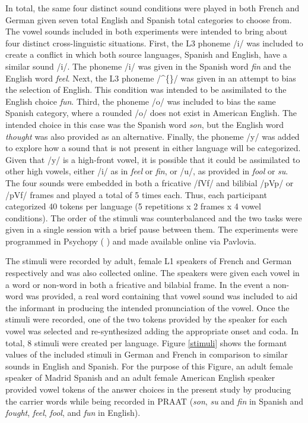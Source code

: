\documentclass[preprints]{Definitions/mdpi}
\begin{document}
In total, the same four distinct sound conditions were played in both French and German given seven total English and Spanish total categories to choose from.
The vowel sounds included in both experiments were intended to bring about four distinct cross-linguistic situations.
First, the L3 phoneme /i/ was included to create a conflict in which both source languages, Spanish and English, have a similar sound /i/.
The phoneme /i/ was given in the Spanish word \emph{fin} and the English word \emph{feel}.
Next, the L3 phoneme /\^{}\{\}/ was given in an attempt to bias the selection of English.
This condition was intended to be assimilated to the English choice \emph{fun}.
Third, the phoneme /o/ was included to bias the same Spanish category, where a rounded /o/ does not exist in American English.
The intended choice in this case was the Spanish word \emph{son}, but the English word \emph{thought} was also provided as an alternative.
Finally, the phoneme /y/ was added to explore how a sound that is not present in either language will be categorized.
Given that /y/ is a high-front vowel, it is possible that it could be assimilated to other high vowels, either /i/ as in \emph{feel} or \emph{fin}, or /u/, as provided in \emph{fool} or \emph{su}.
The four sounds were embedded in both a fricative /fVf/ and bilibial /pVp/ or /pVf/ frames and played a total of 5 times each.
Thus, each participant categorized 40 tokens per language (5 repetitions x 2 frames x 4 vowel conditions).
The order of the stimuli was counterbalanced and the two tasks were given in a single session with a brief pause between them.
The experiments were programmed in Psychopy (\citeauthor{peirce_psychopy2_2019} \citeyear{peirce_psychopy2_2019}) and made available online via Pavlovia.

The stimuli were recorded by adult, female L1 speakers of French and German respectively and was also collected online.
The speakers were given each vowel in a word or non-word in both a fricative and bilabial frame.
In the event a non-word was provided, a real word containing that vowel sound was included to aid the informant in producing the intended pronunciation of the vowel.
Once the stimuli were recorded, one of the two tokens provided by the speaker for each vowel was selected and re-synthesized adding the appropriate onset and coda.
In total, 8 stimuli were created per language.
Figure \ref{stimuli} shows the formant values of the included stimuli in German and French in comparison to similar sounds in English and Spanish.
For the purpose of this Figure, an adult female speaker of Madrid Spanish and an adult female American English speaker provided vowel tokens of the answer choices in the present study by producing the carrier words while being recorded in PRAAT (\emph{son}, \emph{su} and \emph{fin} in Spanish and \emph{fought}, \emph{feel}, \emph{fool}, and \emph{fun} in English).
\end{document}
